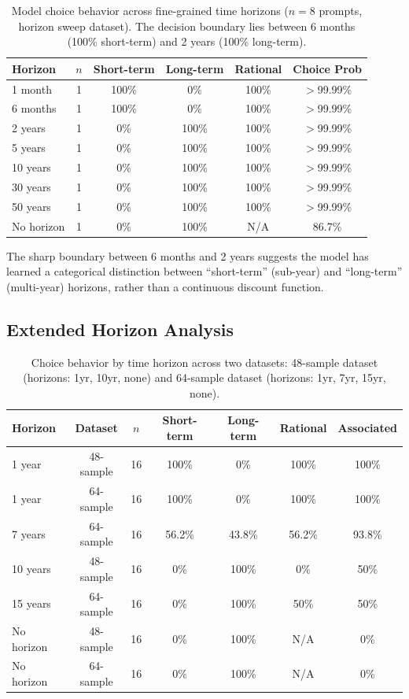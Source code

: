 \documentclass{article}
\begin{document}
\begin{table}[h]
\caption{Model choice behavior across fine-grained time horizons ($n=8$ prompts, horizon sweep dataset). The decision boundary lies between 6 months (100\% short-term) and 2 years (100\% long-term).}
\label{tab:horizon_sweep}
\centering
\begin{tabular}{lccccc}
\toprule
Horizon & $n$ & Short-term & Long-term & Rational & Choice Prob \\
\midrule
1 month & 1 & 100\% & 0\% & 100\% & $>$99.99\% \\
6 months & 1 & 100\% & 0\% & 100\% & $>$99.99\% \\
\midrule
2 years & 1 & 0\% & 100\% & 100\% & $>$99.99\% \\
5 years & 1 & 0\% & 100\% & 100\% & $>$99.99\% \\
10 years & 1 & 0\% & 100\% & 100\% & $>$99.99\% \\
30 years & 1 & 0\% & 100\% & 100\% & $>$99.99\% \\
50 years & 1 & 0\% & 100\% & 100\% & $>$99.99\% \\
\midrule
No horizon & 1 & 0\% & 100\% & N/A & 86.7\% \\
\bottomrule
\end{tabular}
\end{table}

The sharp boundary between 6 months and 2 years suggests the model has learned a categorical distinction between ``short-term'' (sub-year) and ``long-term'' (multi-year) horizons, rather than a continuous discount function.

\subsection{Extended Horizon Analysis}

\begin{table}[h]
\caption{Choice behavior by time horizon across two datasets: 48-sample dataset (horizons: 1yr, 10yr, none) and 64-sample dataset (horizons: 1yr, 7yr, 15yr, none).}
\label{tab:extended_horizon}
\centering
\begin{tabular}{lcccccc}
\toprule
Horizon & Dataset & $n$ & Short-term & Long-term & Rational & Associated \\
\midrule
1 year & 48-sample & 16 & 100\% & 0\% & 100\% & 100\% \\
1 year & 64-sample & 16 & 100\% & 0\% & 100\% & 100\% \\
\midrule
7 years & 64-sample & 16 & 56.2\% & 43.8\% & 56.2\% & 93.8\% \\
\midrule
10 years & 48-sample & 16 & 0\% & 100\% & 0\% & 50\% \\
15 years & 64-sample & 16 & 0\% & 100\% & 50\% & 50\% \\
\midrule
No horizon & 48-sample & 16 & 0\% & 100\% & N/A & 0\% \\
No horizon & 64-sample & 16 & 0\% & 100\% & N/A & 0\% \\
\bottomrule
\end{tabular}
\end{table}
\end{document}
